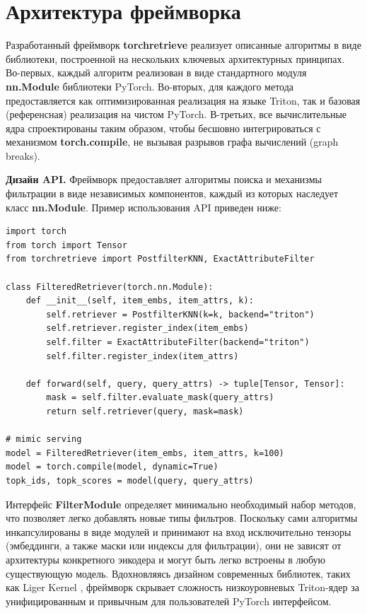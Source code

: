 \documentclass[14pt,a4paper]{extreport}
\numberwithin{figure}{chapter}
\numberwithin{table}{chapter}
\numberwithin{equation}{chapter}
\begin{document}
\chapter{Архитектура фреймворка}

Разработанный фреймворк \textbf{torchretrieve} реализует описанные алгоритмы в виде библиотеки, построенной на нескольких ключевых архитектурных принципах. Во-первых, каждый алгоритм реализован в виде стандартного модуля \textbf{nn.Module} библиотеки PyTorch. Во-вторых, для каждого метода предоставляется как оптимизированная реализация на языке Triton, так и базовая (референсная) реализация на чистом PyTorch. В-третьих, все вычислительные ядра спроектированы таким образом, чтобы бесшовно интегрироваться с механизмом \textbf{torch.compile}, не вызывая разрывов графа вычислений (graph breaks).

\textbf{Дизайн API.} Фреймворк предоставляет алгоритмы поиска и механизмы фильтрации в виде независимых компонентов, каждый из которых наследует класс \textbf{nn.Module}. Пример использования API приведен ниже:

\begin{verbatim}
import torch
from torch import Tensor
from torchretrieve import PostfilterKNN, ExactAttributeFilter

class FilteredRetriever(torch.nn.Module):
    def __init__(self, item_embs, item_attrs, k):
        self.retriever = PostfilterKNN(k=k, backend="triton")
        self.retriever.register_index(item_embs)
        self.filter = ExactAttributeFilter(backend="triton")
        self.filter.register_index(item_attrs)

    def forward(self, query, query_attrs) -> tuple[Tensor, Tensor]:
        mask = self.filter.evaluate_mask(query_attrs)
        return self.retriever(query, mask=mask)

# mimic serving
model = FilteredRetriever(item_embs, item_attrs, k=100)
model = torch.compile(model, dynamic=True)
topk_ids, topk_scores = model(query, query_attrs)
\end{verbatim}

Интерфейс \textbf{FilterModule} определяет минимально необходимый набор методов, что позволяет легко добавлять новые типы фильтров. Поскольку сами алгоритмы инкапсулированы в виде модулей и принимают на вход исключительно тензоры (эмбеддинги, а также маски или индексы для фильтрации), они не зависят от архитектуры конкретного энкодера и могут быть легко встроены в любую существующую модель. Вдохновляясь дизайном современных библиотек, таких как Liger Kernel \cite{hsu2024liger}, фреймворк скрывает сложность низкоуровневых Triton-ядер за унифицированным и привычным для пользователей PyTorch интерфейсом.
\end{document}
